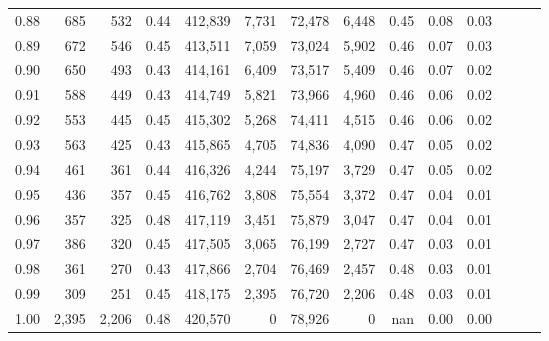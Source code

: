 \begin{tabular}{rrrrrrrrrrrrrr}
0.88 &     685 &    532 &  0.44 &  412,839 &    7,731 &  72,478 &   6,448 &  0.45 &  0.08 &      0.03 \\
0.89 &     672 &    546 &  0.45 &  413,511 &    7,059 &  73,024 &   5,902 &  0.46 &  0.07 &      0.03 \\
0.90 &     650 &    493 &  0.43 &  414,161 &    6,409 &  73,517 &   5,409 &  0.46 &  0.07 &      0.02 \\
0.91 &     588 &    449 &  0.43 &  414,749 &    5,821 &  73,966 &   4,960 &  0.46 &  0.06 &      0.02 \\
0.92 &     553 &    445 &  0.45 &  415,302 &    5,268 &  74,411 &   4,515 &  0.46 &  0.06 &      0.02 \\
0.93 &     563 &    425 &  0.43 &  415,865 &    4,705 &  74,836 &   4,090 &  0.47 &  0.05 &      0.02 \\
0.94 &     461 &    361 &  0.44 &  416,326 &    4,244 &  75,197 &   3,729 &  0.47 &  0.05 &      0.02 \\
0.95 &     436 &    357 &  0.45 &  416,762 &    3,808 &  75,554 &   3,372 &  0.47 &  0.04 &      0.01 \\
0.96 &     357 &    325 &  0.48 &  417,119 &    3,451 &  75,879 &   3,047 &  0.47 &  0.04 &      0.01 \\
0.97 &     386 &    320 &  0.45 &  417,505 &    3,065 &  76,199 &   2,727 &  0.47 &  0.03 &      0.01 \\
0.98 &     361 &    270 &  0.43 &  417,866 &    2,704 &  76,469 &   2,457 &  0.48 &  0.03 &      0.01 \\
0.99 &     309 &    251 &  0.45 &  418,175 &    2,395 &  76,720 &   2,206 &  0.48 &  0.03 &      0.01 \\
1.00 &   2,395 &  2,206 &  0.48 &  420,570 &        0 &  78,926 &       0 &   nan &  0.00 &      0.00 \\
\bottomrule
\end{tabular}
